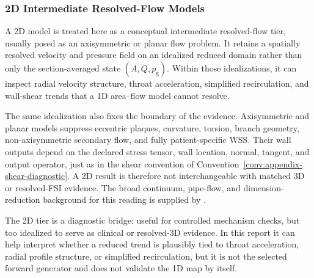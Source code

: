 \subsubsection{2D Intermediate Resolved-Flow Models}
\label{subsubsec:2d-models}

A 2D model is treated here as a conceptual intermediate resolved-flow tier,
usually posed as an axisymmetric or planar flow problem. It retains a spatially
resolved velocity and pressure field on an idealized reduced domain rather than
only the section-averaged state $(A,Q,p_{\mathrm g})$. Within those
idealizations, it can inspect radial velocity structure, throat acceleration,
simplified recirculation, and wall-shear trends that a 1D area--flow model
cannot resolve.

The same idealization also fixes the boundary of the evidence. Axisymmetric and
planar models suppress eccentric plaques, curvature, torsion, branch geometry,
non-axisymmetric secondary flow, and fully patient-specific WSS\@. Their wall
outputs depend on the declared stress tensor, wall location, normal, tangent,
and output operator, just as in the shear convention of
Convention~\ref{conv:appendix-shear-diagnostic}. A 2D result is therefore not
interchangeable with matched 3D or resolved-FSI evidence. The broad continuum,
pipe-flow, and dimension-reduction background for this reading is supplied by
\cite{GaldiEtAl2008HemodynamicalFlows,KopplHelmig2023DimensionReducedModeling}.

The 2D tier is a diagnostic bridge: useful for controlled mechanism checks, but
too idealized to serve as clinical or resolved-3D evidence. In this report it
can help interpret whether a reduced trend is plausibly tied to throat
acceleration, radial profile structure, or simplified recirculation, but it is
not the selected forward generator and does not validate the 1D map by itself.
